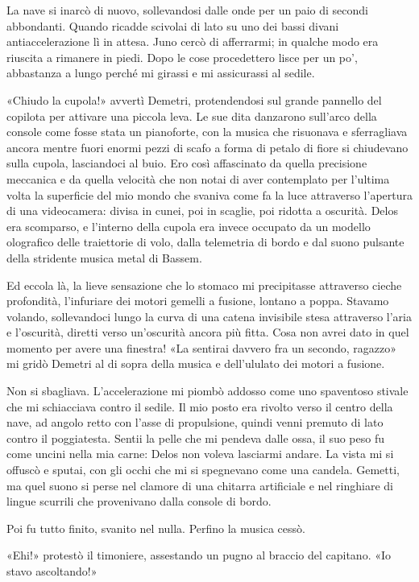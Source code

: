La nave si inarcò di nuovo, sollevandosi dalle onde per un paio di
secondi abbondanti. Quando ricadde scivolai di lato su uno dei bassi
divani antiaccelerazione lì in attesa. Juno cercò di afferrarmi; in
qualche modo era riuscita a rimanere in piedi. Dopo le cose procedettero
lisce per un po', abbastanza a lungo perché mi girassi e mi assicurassi
al sedile.

«Chiudo la cupola!» avvertì Demetri, protendendosi sul grande pannello
del copilota per attivare una piccola leva. Le sue dita danzarono
sull'arco della console come fosse stata un pianoforte, con la musica
che risuonava e sferragliava ancora mentre fuori enormi pezzi di scafo a
forma di petalo di fiore si chiudevano sulla cupola, lasciandoci al
buio. Ero così affascinato da quella precisione meccanica e da quella
velocità che non notai di aver contemplato per l'ultima volta la
superficie del mio mondo che svaniva come fa la luce attraverso
l'apertura di una videocamera: divisa in cunei, poi in scaglie, poi
ridotta a oscurità. Delos era scomparso, e l'interno della cupola era
invece occupato da un modello olografico delle traiettorie di volo,
dalla telemetria di bordo e dal suono pulsante della stridente musica
metal di Bassem.

Ed eccola là, la lieve sensazione che lo stomaco mi precipitasse
attraverso cieche profondità, l'infuriare dei motori gemelli a fusione,
lontano a poppa. Stavamo volando, sollevandoci lungo la curva di una
catena invisibile stesa attraverso l'aria e l'oscurità, diretti verso
un'oscurità ancora più fitta. Cosa non avrei dato in quel momento per
avere una finestra! «La sentirai davvero fra un secondo, ragazzo» mi
gridò Demetri al di sopra della musica e dell'ululato dei motori a
fusione.

Non si sbagliava. L'accelerazione mi piombò addosso come uno spaventoso
stivale che mi schiacciava contro il sedile. Il mio posto era rivolto
verso il centro della nave, ad angolo retto con l'asse di propulsione,
quindi venni premuto di lato contro il poggiatesta. Sentii la pelle che
mi pendeva dalle ossa, il suo peso fu come uncini nella mia carne: Delos
non voleva lasciarmi andare. La vista mi si offuscò e sputai, con gli
occhi che mi si spegnevano come una candela. Gemetti, ma quel suono si
perse nel clamore di una chitarra artificiale e nel ringhiare di lingue
scurrili che provenivano dalla console di bordo.

Poi fu tutto finito, svanito nel nulla. Perfino la musica cessò.

«Ehi!» protestò il timoniere, assestando un pugno al braccio del
capitano. «Io stavo ascoltando!»

